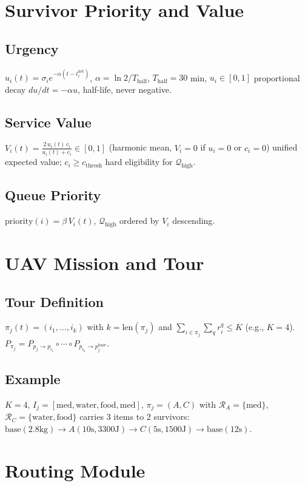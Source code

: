 \documentclass[conference]{IEEEtran}
\begin{document}
\section{Survivor Priority and Value}

\subsection{Urgency}
$u_i(t)=\sigma_i e^{-\alpha(t-t_i^{\text{det}})}$, $\alpha=\ln2/T_{\text{half}}$, $T_{\text{half}}=30$ min, $u_i\in[0,1]$ proportional decay $du/dt=-\alpha u$, half-life, never negative.

\subsection{Service Value}
$V_i(t)=\frac{2\,u_i(t)\,c_i}{u_i(t)+c_i}\in[0,1]$ (harmonic mean, $V_i=0$ if $u_i=0$ or $c_i=0$) unified expected value; $c_i\geq c_{\text{thresh}}$ hard eligibility for $\mathcal{Q}_{\text{high}}$.

\subsection{Queue Priority}
$\text{priority}(i)=\beta\,V_i(t)$, $\mathcal{Q}_{\text{high}}$ ordered by $V_i$ descending.

\section{UAV Mission and Tour}

\subsection{Tour Definition}
$\pi_j(t)=(i_1,\dots,i_k)$ with $k=\text{len}(\pi_j)$ and $\sum_{i\in\pi_j}\sum_q r_i^q \leq K$ (e.g., $K=4$). $P_{\pi_j}=P_{p_j\to p_{i_1}}\circ\cdots\circ P_{p_{i_k}\to p_j^{\text{base}}}$.

\subsection{Example}
$K=4$, $I_j=[\text{med},\text{water},\text{food},\text{med}]$, $\pi_j=(A,C)$ with $\mathcal{R}_A=\{\text{med}\}$, $\mathcal{R}_C=\{\text{water},\text{food}\}$ carries $3$ items to $2$ survivors: $\text{base}(2.8\text{kg})\to A(10\text{s},3300\text{J})\to C(5\text{s},1500\text{J})\to\text{base}(12\text{s})$.

\section{Routing Module}
\end{document}
